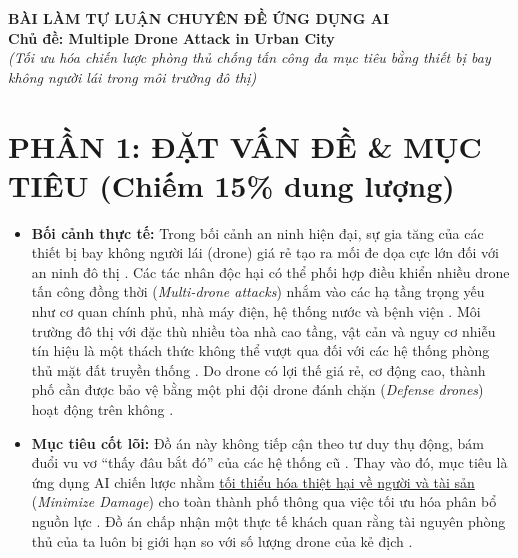 \documentclass[../main.tex]{subfiles}
\begin{document}

\begin{center}
    \textbf{\LARGE BÀI LÀM TỰ LUẬN CHUYÊN ĐỀ ỨNG DỤNG AI} \\
    \vspace{0.2cm}
    \textbf{\large Chủ đề: Multiple Drone Attack in Urban City} \\
    \textit{(Tối ưu hóa chiến lược phòng thủ chống tấn công đa mục tiêu bằng thiết bị bay không người lái trong môi trường đô thị)}
\end{center}

\vspace{0.5cm}

\section{PHẦN 1: ĐẶT VẤN ĐỀ \& MỤC TIÊU (Chiếm 15\% dung lượng)}

\begin{itemize}
    \item \textbf{Bối cảnh thực tế:} Trong bối cảnh an ninh hiện đại, sự gia tăng của các thiết bị bay không người lái (drone) giá rẻ tạo ra mối đe dọa cực lớn đối với an ninh đô thị \cite{mutzari2025defending}. Các tác nhân độc hại có thể phối hợp điều khiển nhiều drone tấn công đồng thời (\textit{Multi-drone attacks}) nhắm vào các hạ tầng trọng yếu như cơ quan chính phủ, nhà máy điện, hệ thống nước và bệnh viện \cite{mutzari2025defending}. Môi trường đô thị với đặc thù nhiều tòa nhà cao tầng, vật cản và nguy cơ nhiễu tín hiệu là một thách thức không thể vượt qua đối với các hệ thống phòng thủ mặt đất truyền thống \cite{mutzari2025defending}. Do drone có lợi thế giá rẻ, cơ động cao, thành phố cần được bảo vệ bằng một phi đội drone đánh chặn (\textit{Defense drones}) hoạt động trên không \cite{mutzari2025defending}.
    \item \textbf{Mục tiêu cốt lõi:} Đồ án này không tiếp cận theo tư duy thụ động, bám đuổi vu vơ ``thấy đâu bắt đó'' của các hệ thống cũ \cite{mutzari2025defending}. Thay vào đó, mục tiêu là ứng dụng AI chiến lược nhằm \underline{tối thiểu hóa thiệt hại về người và tài sản} (\textit{Minimize Damage}) cho toàn thành phố thông qua việc tối ưu hóa phân bổ nguồn lực \cite{mutzari2025defending}. Đồ án chấp nhận một thực tế khách quan rằng tài nguyên phòng thủ của ta luôn bị giới hạn so với số lượng drone của kẻ địch \cite{mutzari2025defending}.
\end{itemize}
\end{document}
